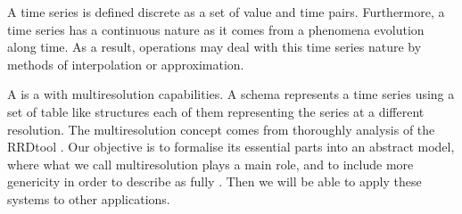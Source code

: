 A time series is defined discrete as a set of value and time
pairs. Furthermore, a time series has a continuous nature as it comes
from a phenomena evolution along time. As a result, 
operations may deal with this time series nature by methods of
interpolation or approximation.


A  is a  with multiresolution capabilities.  A
 schema represents a time series using a set of table like
structures each of them representing the series at a different
resolution.
The multiresolution concept comes from thoroughly analysis of the
RRDtool \cite{rrdtool} . Our objective is to formalise its
essential parts into an abstract model, where what we call
multiresolution plays a main role, and to include more genericity in
order to describe  as fully . Then we will be
able to apply these systems to other applications.


